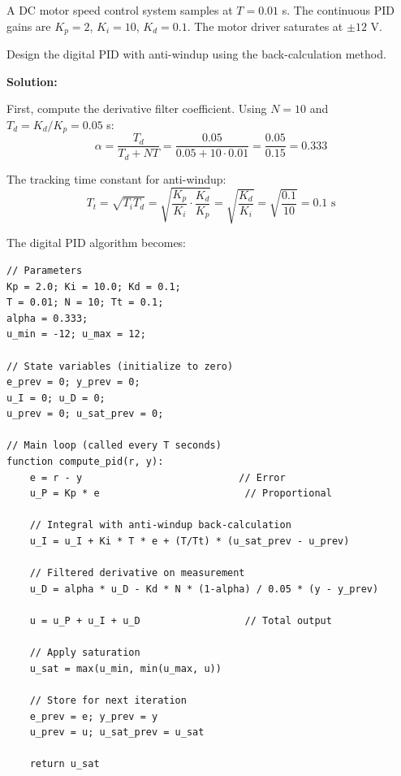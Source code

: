 \begin{example}
\label{ex:digital_pid_motor}

A DC motor speed control system samples at $T = 0.01$ s. The continuous PID gains are $K_p = 2$, $K_i = 10$, $K_d = 0.1$. The motor driver saturates at $\pm 12$ V.

Design the digital PID with anti-windup using the back-calculation method.

\textbf{Solution:}

First, compute the derivative filter coefficient. Using $N = 10$ and $T_d = K_d/K_p = 0.05$ s:
\begin{equation}
\alpha = \frac{T_d}{T_d + NT} = \frac{0.05}{0.05 + 10 \cdot 0.01} = \frac{0.05}{0.15} = 0.333
\end{equation}

The tracking time constant for anti-windup:
\begin{equation}
T_t = \sqrt{T_i T_d} = \sqrt{\frac{K_p}{K_i} \cdot \frac{K_d}{K_p}} = \sqrt{\frac{K_d}{K_i}} = \sqrt{\frac{0.1}{10}} = 0.1 \text{ s}
\end{equation}

The digital PID algorithm becomes:

\begin{verbatim}
// Parameters
Kp = 2.0; Ki = 10.0; Kd = 0.1;
T = 0.01; N = 10; Tt = 0.1;
alpha = 0.333;
u_min = -12; u_max = 12;

// State variables (initialize to zero)
e_prev = 0; y_prev = 0;
u_I = 0; u_D = 0;
u_prev = 0; u_sat_prev = 0;

// Main loop (called every T seconds)
function compute_pid(r, y):
    e = r - y                           // Error
    u_P = Kp * e                         // Proportional

    // Integral with anti-windup back-calculation
    u_I = u_I + Ki * T * e + (T/Tt) * (u_sat_prev - u_prev)

    // Filtered derivative on measurement
    u_D = alpha * u_D - Kd * N * (1-alpha) / 0.05 * (y - y_prev)

    u = u_P + u_I + u_D                  // Total output

    // Apply saturation
    u_sat = max(u_min, min(u_max, u))

    // Store for next iteration
    e_prev = e; y_prev = y
    u_prev = u; u_sat_prev = u_sat

    return u_sat
\end{verbatim}


\end{example}
